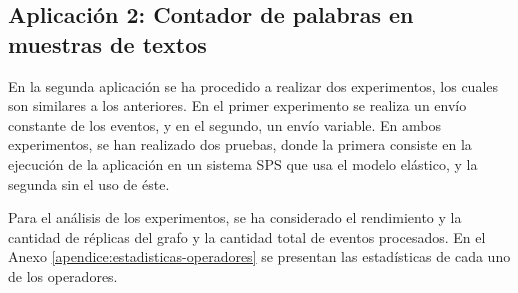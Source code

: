 \subsection{Aplicaci\'on 2: Contador de palabras en muestras de textos}
En la segunda aplicaci\'on se ha procedido a realizar dos experimentos, los cuales son similares a los anteriores. En el primer experimento se realiza un env\'io constante de los eventos, y en el segundo, un env\'io variable. En ambos experimentos, se han realizado dos pruebas, donde la primera consiste en la ejecuci\'on de la aplicaci\'on en un sistema SPS que usa el modelo el\'astico, y la segunda sin el uso de \'este.

\normalsize{Para el an\'alisis de los experimentos, se ha considerado el rendimiento y la cantidad de r\'eplicas del grafo y la cantidad total de eventos procesados. En el Anexo} \ref{apendice:estadisticas-operadores} \normalsize{se presentan las estad\'isticas de cada uno de los operadores.}


